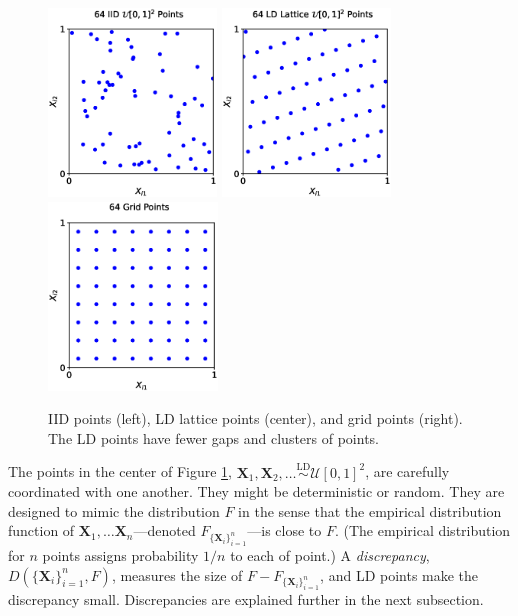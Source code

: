 \documentclass[11pt]{NSFamsart}
\newcommand{\bX}{{\boldsymbol{X}}}
\newcommand{\calu}{{\mathcal{U}}}
\newcommand{\LDSim}{\overset{\text{LD}}{\sim}}
\begin{document}
\begin{figure}
	\centering
	\includegraphics[height = 5cm]{ProgramsImages/iid_scatter.eps} \quad
	\includegraphics[height = 5cm]{ProgramsImages/lattice_scatter.eps} \quad
	\includegraphics[height = 5cm]{ProgramsImages/grid_scatter.eps}
	\caption{IID points (left), LD lattice points (center), and grid points (right).  The LD points have fewer gaps and clusters of points. \label{fig:iid_vs_ld}}
\end{figure}

The  points in the center of Figure \ref{fig:iid_vs_ld}, $\bX_1, \bX_2,  \ldots \LDSim \calu[0,1]^2$, are carefully coordinated with one another.  They might be deterministic or random.  They are designed to mimic the distribution $F$  in the sense that the empirical distribution function of  $\bX_1, \ldots \bX_n$---denoted $F_{\{\bX_i\}_{i=1}^n}$---is close to $F$.  (The empirical distribution for $n$  points assigns probability $1/n$ to each of point.)  A \emph{discrepancy}, $D(\{\bX_i\}_{i=1}^n, F)$, measures the size of $F - F_{\{\bX_i\}_{i=1}^n}$, and LD points make the discrepancy small.  Discrepancies are explained further in the next subsection.
\end{document}
